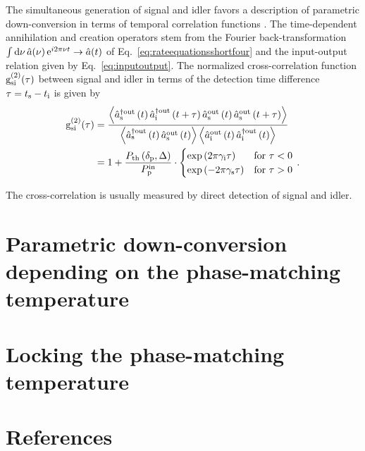 \documentclass[aps,pra,showpacs,reprint,onecolumn,notitlepage]{revtex4-1}
\newcommand{\avr}[1]{\mathop{\left\langle #1 \right\rangle}\nolimits}
\newcommand{\tx}[1]{\textnormal{#1}}
\begin{document}
The simultaneous generation of signal and idler  favors a description of parametric down-conversion in terms of temporal correlation functions \cite{Fekete2013,glauber1963,Michael2013,Ou1999,Scholz2009,Bocquillon2009,Bettelli2010,Luo2015}. The time-dependent annihilation and creation operators stem from the Fourier back-transformation $\int \tx{d} \nu \, \hat{a}(\nu) \, \tx{e}^{i2 \pi \nu t} \rightarrow \hat{a}(t)$ of Eq.~\ref{eq:rateequationsshortfour} and the input-output relation given by Eq.~\ref{eq:inputoutput}. The normalized cross-correlation function $\tx{g}^{(2)}_\textrm{si}(\tau)$  between signal and idler in terms of the detection time difference $\tau = t_\tx{s} - t_\tx{i}$ is given by
\begin{align}
	\tx{g}^{(2)}_\textrm{si}(\tau) &= \frac{ \avr{\hat{a}_\tx{s}^{\dagger \tx{out}} \left(t\right) \hat{a}_\tx{i}^{\dagger \tx{out}}\left(t+\tau\right) \hat{a}^{\tx{out}}_\tx{s} \left(t\right) \hat{a}^{\tx{out}}_\tx{s}\left(t+\tau\right)} }{\avr{\hat{a}^{\dagger \tx{out}}_\tx{s} \left(t\right) \hat{a}^{\tx{out}}_\tx{s} \left(t\right)} \avr{ \hat{a}^{\tx{out}}_\tx{i} \left(t\right) \hat{a}^{\dagger \tx{out}}_\tx{i}\left(t\right)} }  \notag \\
	&= 1 + \frac{ P_\textrm{th}\left( \delta_\textrm{p},\Delta \right) }{ P^\tx{in}_\textrm{p}  }  \cdot 
	\begin{cases}
        \tx{exp} \left(   2 \pi \gamma_\tx{i} \tau \right)  &\tx{for } \tau < 0  \\
        \tx{exp} \left( - 2 \pi \gamma_\tx{s} \tau \right) &\tx{for } \tau  > 0
        \end{cases}  \, .
	\label{eq:crosscorrelation}
\end{align}

The cross-correlation is usually measured by direct detection of signal and idler.

\section{Parametric down-conversion depending on the phase-matching temperature}

\section{Locking the phase-matching temperature}

\section{References}
	
	
%	

%
\end{document}
